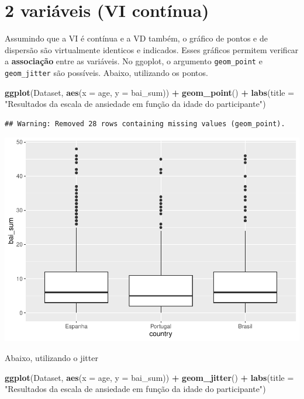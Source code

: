 \documentclass[
]{book}
\newenvironment{Shaded}{\begin{snugshade}}{\end{snugshade}}
\newcommand{\DataTypeTok}[1]{\textcolor[rgb]{0.13,0.29,0.53}{#1}}
\newcommand{\KeywordTok}[1]{\textcolor[rgb]{0.13,0.29,0.53}{\textbf{#1}}}
\newcommand{\NormalTok}[1]{#1}
\newcommand{\OperatorTok}[1]{\textcolor[rgb]{0.81,0.36,0.00}{\textbf{#1}}}
\newcommand{\StringTok}[1]{\textcolor[rgb]{0.31,0.60,0.02}{#1}}
\begin{document}
\hypertarget{variuxe1veis-vi-contuxednua}{%
\section{2 variáveis (VI contínua)}\label{variuxe1veis-vi-contuxednua}}

Assumindo que a VI é contínua e a VD também, o gráfico de pontos e de dispersão são virtualmente identicos e indicados. Esses gráficos permitem verificar a \textbf{associação} entre as variáveis. No ggoplot, o argumento \texttt{geom\_point} e \texttt{geom\_jitter} são possíveis. Abaixo, utilizando os pontos.

\begin{Shaded}
\begin{Highlighting}[]
\KeywordTok{ggplot}\NormalTok{(Dataset, }\KeywordTok{aes}\NormalTok{(}\DataTypeTok{x =}\NormalTok{ age, }\DataTypeTok{y =}\NormalTok{ bai_sum)) }\OperatorTok{+}
\StringTok{  }\KeywordTok{geom_point}\NormalTok{() }\OperatorTok{+}
\StringTok{  }\KeywordTok{labs}\NormalTok{(}\DataTypeTok{title =} \StringTok{"Resultados da escala de ansiedade em função da idade do participante"}\NormalTok{)}
\end{Highlighting}
\end{Shaded}

\begin{verbatim}
## Warning: Removed 28 rows containing missing values (geom_point).
\end{verbatim}

\includegraphics{gitbook-demo_files/figure-latex/unnamed-chunk-21-1.pdf}

Abaixo, utilizando o jitter

\begin{Shaded}
\begin{Highlighting}[]
\KeywordTok{ggplot}\NormalTok{(Dataset, }\KeywordTok{aes}\NormalTok{(}\DataTypeTok{x =}\NormalTok{ age, }\DataTypeTok{y =}\NormalTok{ bai_sum)) }\OperatorTok{+}
\StringTok{  }\KeywordTok{geom_jitter}\NormalTok{() }\OperatorTok{+}
\StringTok{  }\KeywordTok{labs}\NormalTok{(}\DataTypeTok{title =} \StringTok{"Resultados da escala de ansiedade em função da idade do participante"}\NormalTok{)}
\end{Highlighting}
\end{Shaded}
\end{document}
